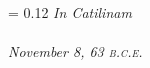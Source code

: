 \documentclass[a4paper, 10pt]{article}
\begin{document}
\begin{titlepage}
  \pagestyle{empty}
  \begingroup
  \centering
  \drop = 0.12\textheight
  \vspace*{\drop}
  {\Huge \itshape In Catilinam}\\[\drop]
  {\HUGE \scshape {}}\\[\drop]
  {\Large \itshape November 8, 63 \textsc{b.c.e.}}\\[0.3\drop]
  \endgroup
  \tableofcontents
\end{titlepage}






\end{document}

